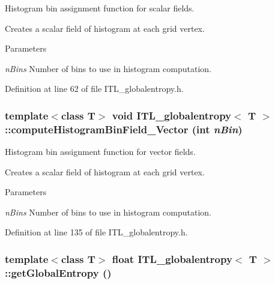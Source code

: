 Histogram bin assignment function for scalar fields. 

Creates a scalar field of histogram at each grid vertex. 
\begin{DoxyParams}{Parameters}
\item[{\em nBins}]Number of bins to use in histogram computation. \end{DoxyParams}


Definition at line 62 of file ITL\_\-globalentropy.h.

\hypertarget{classITL__globalentropy_a6929e8efe91de1d1d604897ac1d1cb0f}{
\subsubsection[{computeHistogramBinField\_\-Vector}]{\setlength{\rightskip}{0pt plus 5cm}template$<$class T$>$ void {\bf ITL\_\-globalentropy}$<$ T $>$::computeHistogramBinField\_\-Vector (int {\em nBin})}}
\label{classITL__globalentropy_a6929e8efe91de1d1d604897ac1d1cb0f}


Histogram bin assignment function for vector fields. 

Creates a scalar field of histogram at each grid vertex. 
\begin{DoxyParams}{Parameters}
\item[{\em nBins}]Number of bins to use in histogram computation. \end{DoxyParams}


Definition at line 135 of file ITL\_\-globalentropy.h.

\hypertarget{classITL__globalentropy_a971ff6f68ca3399c374f52f24bb1232c}{
\subsubsection[{getGlobalEntropy}]{\setlength{\rightskip}{0pt plus 5cm}template$<$class T$>$ float {\bf ITL\_\-globalentropy}$<$ T $>$::getGlobalEntropy ()}}
\label{classITL__globalentropy_a971ff6f68ca3399c374f52f24bb1232c}



